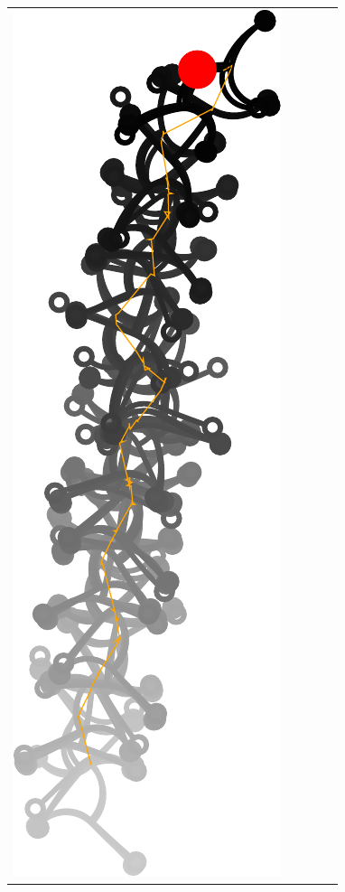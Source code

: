 \documentclass[10pt,a4paper]{article}
\begin{document}
\begin{tabular}{ccccc}
\includegraphics[scale=.5]{pics/pathplanner_with_noise/example_straight_02/gait.pdf}
&

\end{tabular}
\end{document}
